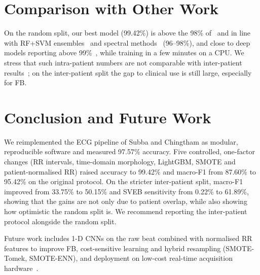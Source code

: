 \documentclass[journal]{IEEEtran}
\begin{document}
\section{Comparison with Other Work}
On the random split, our best model (99.42\%) is above the 98\% of~\cite{subba2024} and in line with RF+SVM ensembles~\cite{bhattacharyya2021} and spectral methods~\cite{liu2020} (96--98\%), and close to deep models reporting above 99\%~\cite{islam2023,khan2023}, while training in a few minutes on a CPU. We stress that such intra-patient numbers are not comparable with inter-patient results~\cite{luz2016}; on the inter-patient split the gap to clinical use is still large, especially for FB.

\section{Conclusion and Future Work}
We reimplemented the ECG pipeline of Subba and Chingtham as modular, reproducible software and measured 97.57\% accuracy. Five controlled, one-factor changes (RR intervals, time-domain morphology, LightGBM, SMOTE and patient-normalised RR) raised accuracy to 99.42\% and macro-F1 from 87.60\% to 95.42\% on the original protocol. On the stricter inter-patient split, macro-F1 improved from 33.75\% to 50.15\% and SVEB sensitivity from 0.22\% to 61.89\%, showing that the gains are not only due to patient overlap, while also showing how optimistic the random split is. We recommend reporting the inter-patient protocol alongside the random split.

Future work includes 1-D CNNs on the raw beat combined with normalised RR features to improve FB, cost-sensitive learning and hybrid resampling (SMOTE-Tomek, SMOTE-ENN), and deployment on low-cost real-time acquisition hardware~\cite{faruk2021}.



\end{document}
